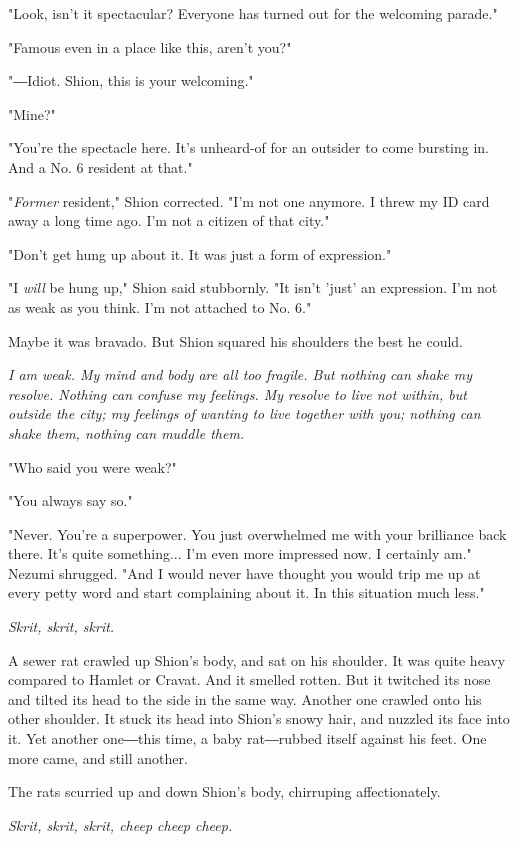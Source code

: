 "Look, isn't it spectacular? Everyone has turned out for the welcoming
parade."

"Famous even in a place like this, aren't you?"

"―Idiot. Shion, this is your welcoming."

"Mine?"

"You're the spectacle here. It's unheard-of for an outsider to come
bursting in. And a No. 6 resident at that."

"\emph{Former} resident," Shion corrected. "I'm not one anymore. I threw my ID
card away a long time ago. I'm not a citizen of that city."

"Don't get hung up about it. It was just a form of expression."

"I \emph{will} be hung up," Shion said stubbornly. "It isn't 'just' an
expression. I'm not as weak as you think. I'm not attached to No. 6."

Maybe it was bravado. But Shion squared his shoulders the best he could.

\emph{I am weak. My mind and body are all too fragile. But nothing can shake
	my resolve. Nothing can confuse my feelings. My resolve to live not
	within, but outside the city; my feelings of wanting to live together
	with you; nothing can shake them, nothing can muddle them.}

"Who said you were weak?"

"You always say so."

"Never. You're a superpower. You just overwhelmed me with your
brilliance back there. It's quite something... I'm even more impressed
now. I certainly am." Nezumi shrugged. "And I would never have thought
you would trip me up at every petty word and start complaining about it.
In this situation much less."

\emph{Skrit, skrit, skrit.}

A sewer rat crawled up Shion's body, and sat on his shoulder. It was
quite heavy compared to Hamlet or Cravat. And it smelled rotten. But it
twitched its nose and tilted its head to the side in the same way.
Another one crawled onto his other shoulder. It stuck its head into
Shion's snowy hair, and nuzzled its face into it. Yet another one―this
time, a baby rat―rubbed itself against his feet. One more came, and
still another.

The rats scurried up and down Shion's body, chirruping affectionately.

\emph{Skrit, skrit, skrit, cheep cheep cheep.}

